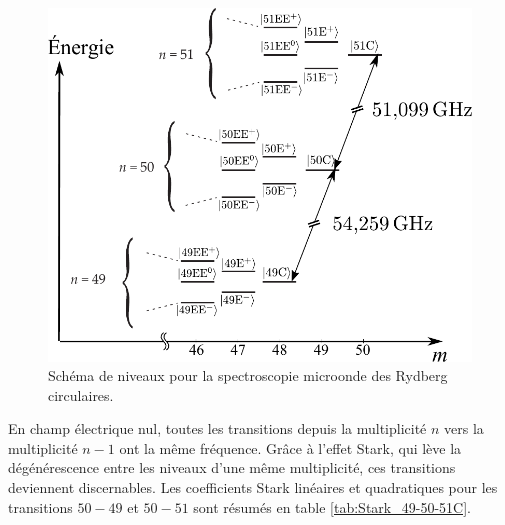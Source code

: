 \begin{figure}[h]
\centering
\includegraphics[width=.7\linewidth]{figures/circulars/levels_49-50-51C}
\caption[Schéma de niveaux pour la spectroscopie microonde des Rydberg circulaires]{
Schéma de niveaux pour la spectroscopie microonde des Rydberg circulaires.
}
\label{fig:levels_49-50-51C}
\end{figure}
%

En champ électrique nul, toutes les transitions depuis la multiplicité $n$ vers la multiplicité $n-1$ ont la même fréquence.
Grâce à l'effet Stark, qui lève la dégénérescence entre les niveaux d'une même multiplicité, ces transitions deviennent discernables.
Les coefficients Stark linéaires et quadratiques pour les transitions $50-49$ et $50-51$ sont résumés en table \eqref{tab:Stark_49-50-51C}.		


